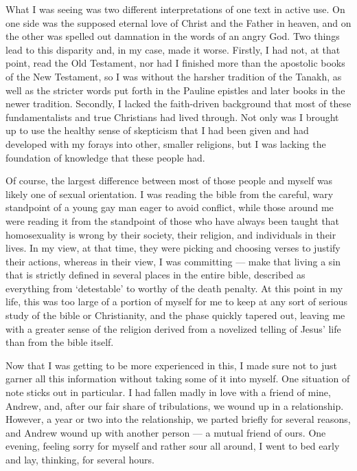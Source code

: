 \documentclass{book}
\begin{document}
What I was seeing was two different interpretations of one text in active use.  On one side was the supposed eternal love of Christ and the Father in heaven, and on the other was spelled out damnation in the words of an angry God.  Two things lead to this disparity and, in my case, made it worse.  Firstly, I had not, at that point, read the Old Testament, nor had I finished more than the apostolic books of the New Testament, so I was without the harsher tradition of the Tanakh, as well as the stricter words put forth in the Pauline epistles and later books in the newer tradition.  Secondly, I lacked the faith-driven background that most of these fundamentalists and true Christians had lived through.  Not only was I brought up to use the healthy sense of skepticism that I had been given and had developed with my forays into other, smaller religions, but I was lacking the foundation of knowledge that these people had.

Of course, the largest difference between most of those people and myself was likely one of sexual orientation.  I was reading the bible from the careful, wary standpoint of a young gay man eager to avoid conflict, while those around me were reading it from the standpoint of those who have always been taught that homosexuality is wrong by their society, their religion, and individuals in their lives.  In my view, at that time, they were picking and choosing verses to justify their actions, whereas in their view, I was committing --- make that living a sin that is strictly defined in several places in the entire bible, described as everything from `detestable' to worthy of the death penalty.  At this point in my life, this was too large of a portion of myself for me to keep at any sort of serious study of the bible or Christianity, and the phase quickly tapered out, leaving me with a greater sense of the religion derived from a novelized telling of Jesus' life than from the bible itself.

Now that I was getting to be more experienced in this, I made sure not to just garner all this information without taking some of it into myself.  One situation of note sticks out in particular.  I had fallen madly in love with a friend of mine, Andrew, and, after our fair share of tribulations, we wound up in a relationship.  However, a year or two into the relationship, we parted briefly for several reasons, and Andrew wound up with another person --- a mutual friend of ours.  One evening, feeling sorry for myself and rather sour all around, I went to bed early and lay, thinking, for several hours.
\end{document}
